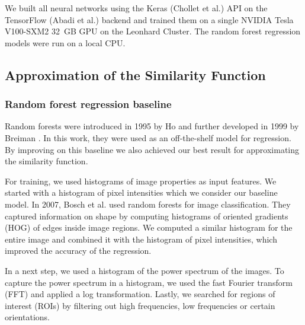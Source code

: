 \documentclass[10pt,conference,compsocconf]{IEEEtran}
\begin{document}
We built all neural networks using the Keras (Chollet et al.\@ \cite{chollet2015keras}) API on the TensorFlow (Abadi et al.\@ \cite{tensorflow2015-whitepaper}) backend and trained them on a single NVIDIA Tesla V100-SXM2 \SI{32}{GB} GPU on the Leonhard Cluster. The random forest regression models were run on a local CPU.

\subsection{Approximation of the Similarity Function}

\subsubsection{Random forest regression baseline} 
Random forests were introduced in 1995 by Ho \cite{Ho} and further developed in 1999 by Breiman \cite{Breiman}. In this work, they were used as an off-the-shelf model for regression. By improving on this baseline we also achieved our best result for approximating the similarity function. 

For training, we used histograms of image properties as input features. We started with a histogram of pixel intensities which we consider our baseline model. In 2007, Bosch et al.\@ \cite{Bosch} used random forests for image classification. They captured information on shape by computing histograms of oriented gradients (HOG) of edges inside image regions. We computed a similar histogram for the entire image and combined it with the histogram of pixel intensities, which improved the accuracy of the regression.

In a next step, we used a histogram of the power spectrum of the images. To capture the power spectrum in a histogram, we used the fast Fourier transform (FFT) and applied a log transformation. Lastly, we searched for regions of interest (ROIs) by filtering out high frequencies, low frequencies or certain orientations.
\end{document}
